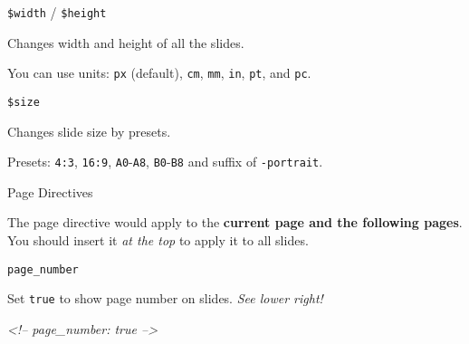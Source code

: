 \documentclass[ignorenonframetext,]{beamer}
\newenvironment{Shaded}{\begin{snugshade}}{\end{snugshade}}
\newcommand{\CommentTok}[1]{\textcolor[rgb]{0.56,0.35,0.01}{\textit{{#1}}}}
\begin{document}
\begin{frame}[fragile]

\begin{block}{\texttt{\$width} / \texttt{\$height}}

Changes width and height of all the slides.

You can use units: \texttt{px} (default), \texttt{cm}, \texttt{mm},
\texttt{in}, \texttt{pt}, and \texttt{pc}.

\begin{Shaded}
\end{Shaded}

\end{block}

\begin{block}{\texttt{\$size}}

Changes slide size by presets.

Presets: \texttt{4:3}, \texttt{16:9}, \texttt{A0}-\texttt{A8},
\texttt{B0}-\texttt{B8} and suffix of \texttt{-portrait}.

\begin{Shaded}
\end{Shaded}

\end{block}

\end{frame}

\begin{frame}[fragile]

\begin{block}{Page Directives}

The page directive would apply to the \textbf{current page and the
following pages}. You should insert it \emph{at the top} to apply it to
all slides.

\begin{block}{\texttt{page\_number}}

Set \texttt{true} to show page number on slides. \emph{See lower right!}

\begin{Shaded}
\begin{Highlighting}[]
\CommentTok{<!-- page_number: true -->}
\end{Highlighting}
\end{Shaded}

\end{block}

\end{block}

\end{frame}
\end{document}
